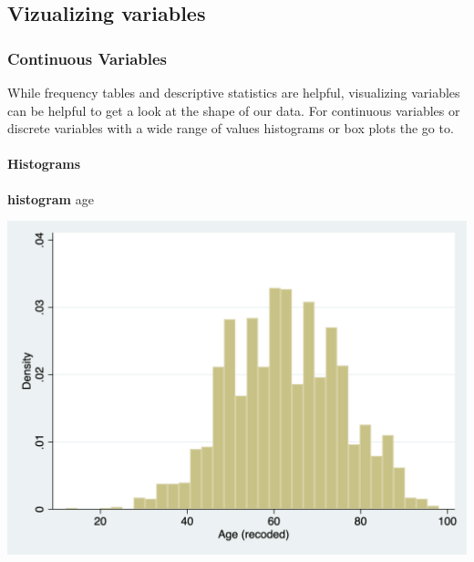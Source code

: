 \documentclass[
]{book}
\newenvironment{Shaded}{\begin{snugshade}}{\end{snugshade}}
\newcommand{\KeywordTok}[1]{\textcolor[rgb]{0.13,0.29,0.53}{\textbf{#1}}}
\newcommand{\NormalTok}[1]{#1}
\begin{document}
\hypertarget{vizualizing-variables}{%
\subsection*{Vizualizing variables}\label{vizualizing-variables}}

\hypertarget{continuous-variables}{%
\subsubsection*{Continuous Variables}\label{continuous-variables}}

While frequency tables and descriptive statistics are helpful, visualizing variables can be helpful to get a look at the shape of our data. For continuous variables or discrete variables with a wide range of values histograms or box plots the go to.

\hypertarget{histogram2}{%
\paragraph*{Histograms}\label{histogram2}}

\begin{Shaded}
\begin{Highlighting}[]
\KeywordTok{histogram}\NormalTok{ age }
\end{Highlighting}
\end{Shaded}

\includegraphics{images/histogram_stata.png}
\end{document}
